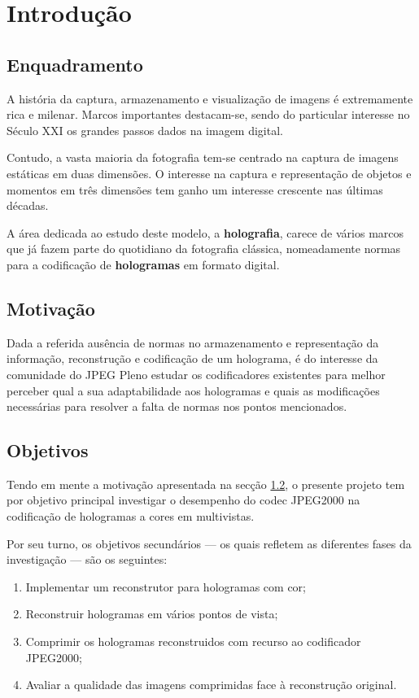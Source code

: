 \chapter{Introdução}
\label{ch::intro}


\section{Enquadramento}
\label{sec::intro:enquad}


A história da captura, armazenamento e visualização de imagens é extremamente rica e milenar. Marcos importantes destacam-se, sendo do particular interesse no Século XXI os grandes passos dados na imagem digital.

Contudo, a vasta maioria da fotografia tem-se centrado na captura de imagens estáticas em duas dimensões. O interesse na captura e representação de objetos e momentos em três dimensões tem ganho um interesse crescente nas últimas décadas.

A área dedicada ao estudo deste modelo, a \textbf{holografia}, carece de vários marcos que já fazem parte do quotidiano da fotografia clássica, nomeadamente normas para a codificação de \textbf{hologramas} em formato digital.


\section{Motivação}
\label{sec::intro:motiv}
Dada a referida ausência de normas no armazenamento e representação da informação, reconstrução e codificação de um holograma, é do interesse da comunidade do JPEG Pleno estudar os codificadores existentes para melhor perceber qual a sua adaptabilidade aos hologramas e quais as modificações necessárias para resolver a falta de normas nos pontos mencionados.


\section{Objetivos}
\label{sec::intro:objs}
Tendo em mente a motivação apresentada na secção \ref{sec::intro:motiv}, o presente projeto tem por objetivo principal investigar o desempenho do codec JPEG2000 na codificação de hologramas a cores em multivistas.

Por seu turno, os objetivos secundários --- os quais refletem as diferentes fases da investigação --- são os seguintes:

\begin{enumerate}
  \item \label{obj:implementar_reconstrutor} Implementar um reconstrutor para hologramas com cor;
  \item \label{obj:reconstruir_vistas} Reconstruir hologramas em vários pontos de vista;
  \item \label{obj:comprimir} Comprimir os hologramas reconstruidos com recurso ao codificador JPEG2000;
  \item \label{obj:avaliar_psnr} Avaliar a qualidade das imagens comprimidas face à reconstrução original.
\end{enumerate}

